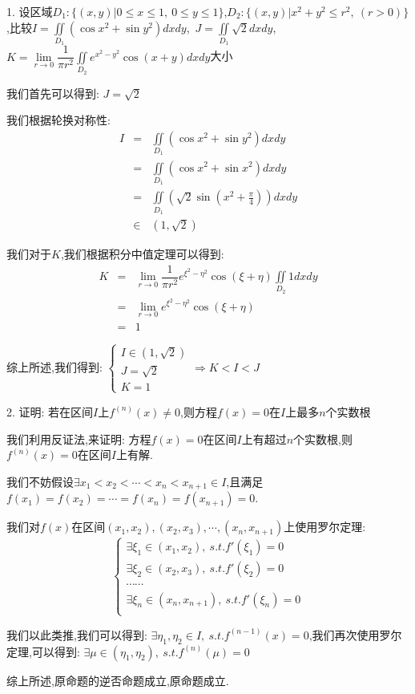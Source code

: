 1. 设区域$D_{1}:\{(x,y)| 0\leq x\leq 1,\ 0\leq y\leq 1\}$,$D_{2}:\{(x,y)| x^2+y^2\leq r^2,\ (r>0)\}$,比较$I=\iint \limits_{D_{1}}\left(\cos x^2+\sin y^2\right) dxdy$,\ $J=\iint\limits_{D_{1}}\sqrt{2}dxdy$,\ $K=\lim\limits_{r\rightarrow 0}\dfrac{1}{\pi r^2}\iint\limits_{D_{2}}e^{x^2-y^2}\cos(x+y)dxdy$大小
\begin{solution}

	我们首先可以得到:  $J=\sqrt{2}$
	
	我们根据轮换对称性:  
	\begin{eqnarray*}
		I&=&\iint \limits_{D_{1}}\left(\cos x^2+\sin y^2\right) dxdy\\
		&=&\iint \limits_{D_{1}}\left(\cos x^2+\sin x^2\right) dxdy\\
		&=&\iint \limits_{D_{1}}\left(\sqrt{2}\sin(x^2+\frac{\pi}{4})\right)dxdy\\
		&\in&(1,\sqrt{2})
	\end{eqnarray*}

	我们对于$K$,我们根据积分中值定理可以得到:  
	\begin{eqnarray*}
		K&=&\lim\limits_{r\rightarrow 0}\dfrac{1}{\pi r^2}e^{\xi^2-\eta^2}\cos(\xi+\eta)\iint\limits_{D_{2}}1dxdy\\
		&=&\lim\limits_{r\rightarrow 0}e^{\xi^2-\eta^2}\cos(\xi+\eta)\\
		&=&1
	\end{eqnarray*}

	综上所述,我们得到:  $\left\lbrace
	\begin{array}{l}
		I\in(1,\sqrt{2})\\
		J=\sqrt{2}\\
		K=1
	\end{array}
	\right.\Rightarrow K<I<J$
\end{solution}

2. 证明:  若在区间$I$上$f^{(n)}(x)\neq 0$,则方程$f(x)=0$在$I$上最多$n$个实数根
\begin{solution}

	我们利用反证法,来证明:  方程$f(x)=0$在区间$I$上有超过$n$个实数根,则$f^{(n)}(x)=0$在区间$I$上有解.
	
	我们不妨假设$\exists x_{1}<x_{2}<\cdots<x_{n}<x_{n+1}\in I$,且满足$f(x_{1})=f(x_{2})=\cdots=f(x_{n})=f(x_{n+1})=0$.
	
	我们对$f(x)$在区间$(x_{1},x_{2}),(x_{2},x_{3}),\cdots,(x_{n},x_{n+1})$上使用罗尔定理:  
	$$\left\lbrace
	\begin{array}{l}
		\exists \xi_{1}\in(x_{1},x_{2}),\ s.t. f'(\xi_{1})=0\\
		\exists \xi_{2}\in(x_{2},x_{3}),\ s.t. f'(\xi_{2})=0\\
		\cdots\cdots\\
		\exists \xi_{n}\in(x_{n},x_{n+1}),\ s.t. f'(\xi_{n})=0\\	
	\end{array}
	\right. $$
	
	我们以此类推,我们可以得到:  $\exists\eta_{1},\eta_{2}\in I,\ s.t. f^{(n-1)}(x)=0$,我们再次使用罗尔定理,可以得到:  
	$\exists \mu\in(\eta_{1},\eta_{2}),\ s.t. f^{(n)}(\mu)=0$
	
	综上所述,原命题的逆否命题成立,原命题成立.
\end{solution}

